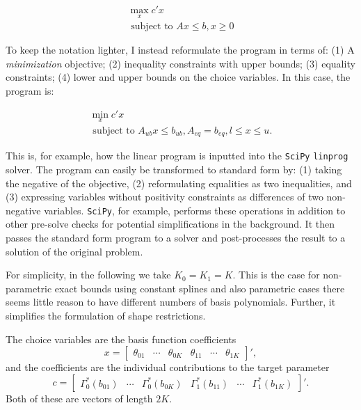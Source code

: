 \documentclass[12pt,a4paper,english]{article} %
\numberwithin{equation}{section}
\theoremstyle{definition}
\theoremstyle{remark}
\theoremstyle{plain}
\begin{document}
\begin{align}
  \max_x c'x \\
  \text{ subject to } Ax\leq b, x\geq0
\end{align}

To keep the notation lighter, I instead reformulate the program in terms of:
(1) A \textit{minimization} objective; (2) inequality constraints with upper bounds; (3) equality constraints; (4) lower and upper bounds on the choice variables.
In this case, the program is:

\begin{align}
  \min_x c'x \\
  \text{ subject to } A_{ub}x \leq b_{ub}, A_{eq} = b_{eq}, l\leq x\leq u.
\end{align}

This is, for example, how the linear program is inputted into the \texttt{SciPy} \texttt{linprog} solver.
The program can easily be transformed to standard form by: (1) taking the negative of the objective, (2) reformulating equalities as two inequalities, and (3) expressing variables without positivity constraints as differences of two non-negative variables.
\texttt{SciPy}, for example, performs these operations in addition to other pre-solve checks for potential simplifications in the background.
It then passes the standard form program to a solver and post-processes the result to a solution of the original problem.

For simplicity, in the following we take $K_0 = K_1 = K$. This is the case for non-parametric exact bounds using constant splines and also parametric cases there seems little reason to have different numbers of basis polynomials.
Further, it simplifies the formulation of shape restrictions.

The choice variables are the basis function coefficients
\begin{equation*}
  x =
  \begin{bmatrix}
     \theta_{01} & \cdots & \theta_{0K} & \theta_{11} & \cdots & \theta_{1K}
  \end{bmatrix}',
\end{equation*}
and the coefficients are the individual contributions to the target parameter
\begin{equation*}
  c =
  \begin{bmatrix}
     \Gamma_0^*(b_{01}) & \cdots & \Gamma_0^*(b_{0K}) & \Gamma_1^*(b_{11}) & \cdots & \Gamma_1^*(b_{1K})
  \end{bmatrix}'.
\end{equation*}
Both of these are vectors of length $2K$.
\end{document}
